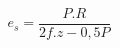 \documentclass[12pt]{article}
\begin{document}
\begin{displaymath}
e_s = \frac {P . R} {2f.z - 0,5P}
\end{displaymath}
\end{document}
